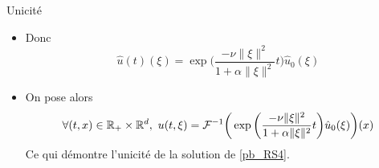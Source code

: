 
\begin{frame}{Unicité}
\begin{itemize}
    \item Donc 
\begin{equation*}
    \hat{u}(t)(\xi) = \exp\bigg(\frac{-\nu \|\xi\|^2}{1+\alpha\|\xi\|^2}t\bigg)\hat{u}_0(\xi)
\end{equation*} 
\item On pose alors 
\begin{equation}\label{sol_Fourier}
    \forall (t,x) \in \mathbb{R}_+\times \mathbb{R}^d, \ u(t,\xi) = \mathcal{F}^{-1}\bigg(\exp\bigg(\frac{-\nu \|\xi\|^2}{1+\alpha\|\xi\|^2}t\bigg)\hat{u}_0(\xi)\bigg)(x)
\end{equation}
Ce qui démontre l'unicité de la solution de \eqref{pb_RS4}.
\end{itemize}
\end{frame}

